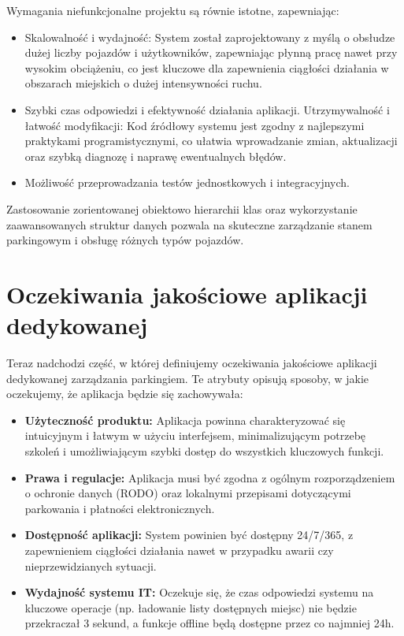 Wymagania niefunkcjonalne projektu są równie istotne, zapewniając:

\begin{itemize}
    \item Skalowalność i wydajność: System został zaprojektowany z myślą o obsłudze dużej liczby pojazdów i użytkowników, zapewniając płynną pracę nawet przy wysokim obciążeniu, co jest kluczowe dla zapewnienia ciągłości działania w obszarach miejskich o dużej intensywności ruchu.
    \item Szybki czas odpowiedzi i efektywność działania aplikacji.
    Utrzymywalność i łatwość modyfikacji: Kod źródłowy systemu jest zgodny z najlepszymi praktykami programistycznymi, co ułatwia wprowadzanie zmian, aktualizacji oraz szybką diagnozę i naprawę ewentualnych błędów.
    \item Możliwość przeprowadzania testów jednostkowych i integracyjnych.
\end{itemize}

Zastosowanie zorientowanej obiektowo hierarchii klas oraz wykorzystanie zaawansowanych struktur danych pozwala na skuteczne zarządzanie stanem parkingowym i obsługę różnych typów pojazdów.
\clearpage
\section{Oczekiwania jakościowe aplikacji dedykowanej}

Teraz nadchodzi część, w której definiujemy oczekiwania jakościowe aplikacji dedykowanej zarządzania parkingiem. Te atrybuty opisują sposoby, w jakie oczekujemy, że aplikacja będzie się zachowywała:

\begin{itemize}
    \item \textbf{Użyteczność produktu:} Aplikacja powinna charakteryzować się intuicyjnym i łatwym w użyciu interfejsem, minimalizującym potrzebę szkoleń i umożliwiającym szybki dostęp do wszystkich kluczowych funkcji.
    \item \textbf{Prawa i regulacje:} Aplikacja musi być zgodna z ogólnym rozporządzeniem o ochronie danych (RODO) oraz lokalnymi przepisami dotyczącymi parkowania i płatności elektronicznych.
    \item \textbf{Dostępność aplikacji:} System powinien być dostępny 24/7/365, z zapewnieniem ciągłości działania nawet w przypadku awarii czy nieprzewidzianych sytuacji.
    \item \textbf{Wydajność systemu IT:} Oczekuje się, że czas odpowiedzi systemu na kluczowe operacje (np. ładowanie listy dostępnych miejsc) nie będzie przekraczał 3 sekund, a funkcje offline będą dostępne przez co najmniej 24h.
\end{itemize}


